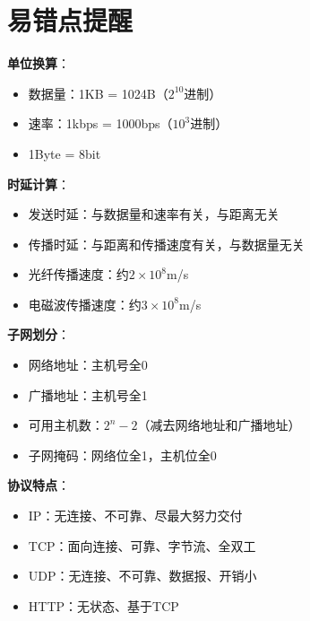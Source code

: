 \section{易错点提醒}

\begin{notebox}
\textbf{单位换算}：
\begin{itemize}[itemsep=0pt]
    \item 数据量：1KB = 1024B（$2^{10}$进制）
    \item 速率：1kbps = 1000bps（$10^3$进制）
    \item 1Byte = 8bit
\end{itemize}
\end{notebox}

\begin{notebox}
\textbf{时延计算}：
\begin{itemize}[itemsep=0pt]
    \item 发送时延：与数据量和速率有关，与距离无关
    \item 传播时延：与距离和传播速度有关，与数据量无关
    \item 光纤传播速度：约$2\times10^8$m/s
    \item 电磁波传播速度：约$3\times10^8$m/s
\end{itemize}
\end{notebox}

\begin{notebox}
\textbf{子网划分}：
\begin{itemize}[itemsep=0pt]
    \item 网络地址：主机号全0
    \item 广播地址：主机号全1
    \item 可用主机数：$2^n - 2$（减去网络地址和广播地址）
    \item 子网掩码：网络位全1，主机位全0
\end{itemize}
\end{notebox}

\begin{notebox}
\textbf{协议特点}：
\begin{itemize}[itemsep=0pt]
    \item IP：无连接、不可靠、尽最大努力交付
    \item TCP：面向连接、可靠、字节流、全双工
    \item UDP：无连接、不可靠、数据报、开销小
    \item HTTP：无状态、基于TCP
\end{itemize}
\end{notebox}

